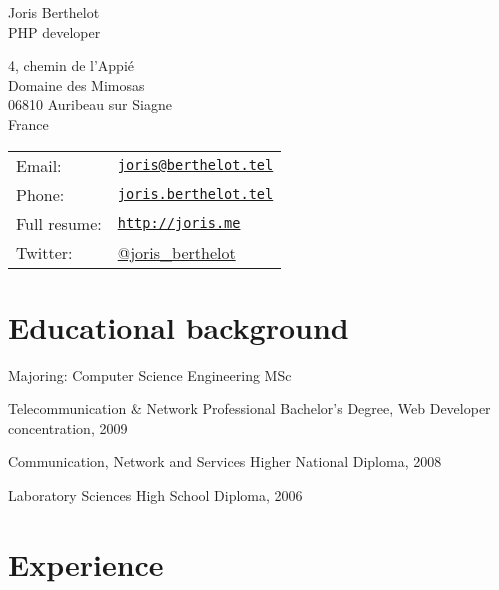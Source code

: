 \documentclass[letterpaper]{article}
\def\name{Joris Berthelot}
\def\title{PHP developer}
\renewenvironment{itemize}{
    \begin{list}{}{
        \setlength{\leftmargin}{1.5em}
    }
}{
    \end{list}
}
\begin{document}
    
    {\Huge \name} \\
    {\Large \title}
    
    
    \vspace{0.25in}
    
    \begin{minipage}{0.65\linewidth}
        4, chemin de l'Appi\'e \\
        Domaine des Mimosas \\
        06810 Auribeau sur Siagne \\
        France
    \end{minipage}
    \begin{minipage}{0.5\linewidth}
        \begin{tabular}{ll}
            Email: & \href{mailto:joris@berthelot.tel}{\tt joris@berthelot.tel} \\
            Phone: & \href{http://joris.berthelot.tel}{\tt joris.berthelot.tel} \\
            Full resume: & \href{http://joris.me}{\tt http://joris.me} \\
            Twitter: & \href{http://twitter.com/joris_berthelot}{@joris\_berthelot}
        \end{tabular}
    \end{minipage}
    
    \section*{Educational background}
        
        \begin{itemize}
            \item Majoring: Computer Science Engineering MSc
            \item Telecommunication \& Network Professional Bachelor's Degree, Web Developer concentration, 2009
            \item Communication, Network and Services Higher National Diploma, 2008
            \item Laboratory Sciences High School Diploma, 2006
        \end{itemize}
        
    \section*{Experience}
        
\end{document}
